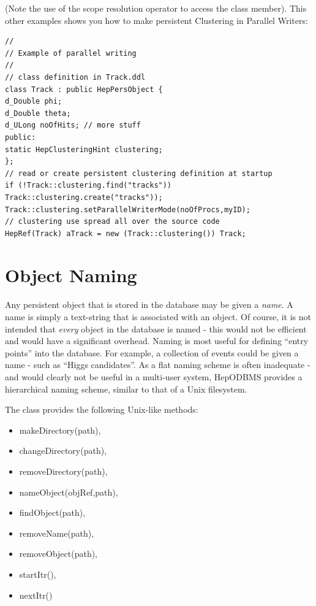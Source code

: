 \par

(Note the use of the scope resolution operator \Lit{::} to access the class member).
This other examples shows you how to make persistent Clustering in Parallel Writers: 
\begin{verbatim}
//
// Example of parallel writing
//
// class definition in Track.ddl 
class Track : public HepPersObject { 
d_Double phi; 
d_Double theta; 
d_ULong noOfHits; // more stuff 
public: 
static HepClusteringHint clustering;
}; 
// read or create persistent clustering definition at startup 
if (!Track::clustering.find("tracks")) 
Track::clustering.create("tracks")); 
Track::clustering.setParallelWriterMode(noOfProcs,myID); 
// clustering use spread all over the source code 
HepRef(Track) aTrack = new (Track::clustering()) Track; 

\end{verbatim}
\section{Object Naming}

\par

Any persistent object that is stored in the database may be given a \emph{name}.
A name is simply a text-string that is associated with an object. Of course, it is 
not intended that \emph{every} object in the database is named - this would not be 
efficient and would have a significant overhead. Naming is most useful for defining
``entry points'' into the database. For example, a collection of events could be
given a name - such as ``Higgs candidates''. As a flat naming scheme is often inadequate
- and would clearly not be useful in a multi-user system, HepODBMS provides a hierarchical
naming scheme, similar to that of a Unix filesystem.

\par
The  class provides the following Unix-like methods:

\begin{itemize}

\item makeDirectory(path), 
\item changeDirectory(path), 
\item removeDirectory(path), 
\item nameObject(objRef,path), 
\item findObject(path), 
\item removeName(path), 
\item removeObject(path), 
\item startItr(), 
\item nextItr() \end{itemize}


